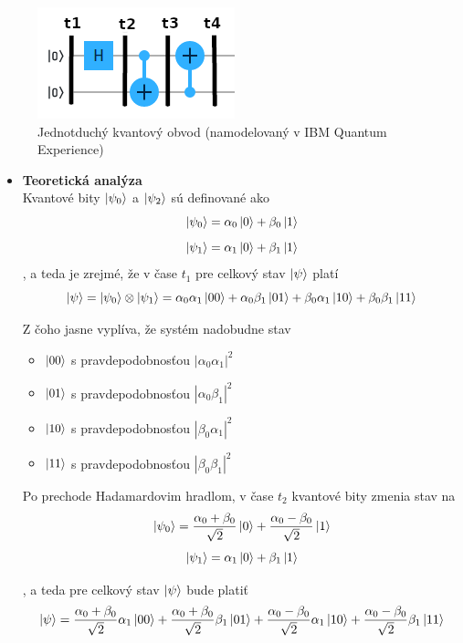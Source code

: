 \begin{figure} 
	\centering 
	\includegraphics[width=.6\textwidth]{figures/expr1_circuit.png} 
	\caption{Jednotduchý kvantový obvod (namodelovaný v IBM Quantum Experience)}
    \label{expr1_circuit}
\end{figure}

\begin{itemize}
\item[] \textbf{Teoretická analýza} \\
Kvantové bity \(\ket{\psi_0}\) a \(\ket{\psi_2}\) sú definované ako 
\[\ket{\psi_0} = \alpha_0\ket{0} + \beta_0\ket{1}\]
\[\ket{\psi_1} = \alpha_1\ket{0} + \beta_1\ket{1}\]
, a teda je zrejmé, že v čase \(t_1\) pre celkový stav \(\ket{\psi}\) platí 
\[\ket{\psi} = \ket{\psi_0} \otimes \ket{\psi_1} = \alpha_0\alpha_1\ket{00} + \alpha_0\beta_1\ket{01} + \beta_0\alpha_1\ket{10} + \beta_0\beta_1\ket{11}\]

Z čoho jasne vyplíva, že systém nadobudne stav
    \begin{itemize}
        \item[] \(\ket{00}\) s pravdepodobnosťou \(|\alpha_0\alpha_1 |^2\)
        \item[] \(\ket{01}\) s pravdepodobnosťou \(| \alpha_0\beta_1 |^2\)
        \item[] \(\ket{10}\) s pravdepodobnosťou \(| \beta_0\alpha_1 |^2\)
        \item[] \(\ket{11}\) s pravdepodobnosťou \(| \beta_0\beta_1 |^2\) 
    \end{itemize}

Po prechode Hadamardovim hradlom, v čase \(t_2\) kvantové bity zmenia stav na
\[\ket{\psi_0} = \frac{\alpha_0 + \beta_0}{\sqrt{2}}\ket{0} + \frac{\alpha_0 - \beta_0}{\sqrt{2}}\ket{1}\]
\[\ket{\psi_1} = \alpha_1\ket{0} + \beta_1\ket{1}\]

, a teda pre celkový stav \(\ket{\psi}\) bude platiť
\[\ket{\psi} = \frac{\alpha_0 + \beta_0}{\sqrt{2}}\alpha_1\ket{00} + \frac{\alpha_0 + \beta_0}{\sqrt{2}}\beta_1\ket{01} + \frac{\alpha_0 - \beta_0}{\sqrt{2}}\alpha_1\ket{10} + \frac{\alpha_0 - \beta_0}{\sqrt{2}}\beta_1\ket{11}\]


\end{itemize}
